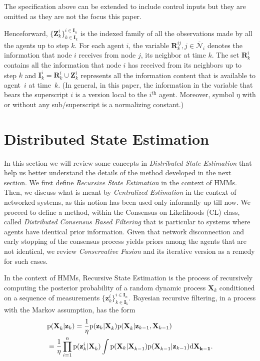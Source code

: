 \documentclass[journal]{IEEEtran}
\newcommand{\vect}[1]{{\mathbf{#1}}}
\theoremstyle{remark}
\newcommand{\pr}{\textrm{p}}
\newcommand{\XX}[3][2]{\mathbf{X}_{  #2}^{ #3}}
\newcommand{\bIn}{\boldsymbol{I}_{{n}}}
\newcommand{\bIk}{\boldsymbol{I}_{{k}}}
\newcommand{\zz}[3][2]{\mathbf{z}_{ #2}^{ #3}}
\newcommand{\ZZ}[3][2]{\mathbf{Z}_{ #2}^{ #3}}
\theoremstyle{definition}
\begin{document}
The specification above can be extended to
include control inputs but they are omitted as they are not the focus this
paper. 

Henceforward, $\{\ZZ{k}{i}\}^{i\in\bIn}_{k\in\bIk}$ is the indexed family of
all the observations made by all the agents up to step $k$. For each
agent $i$, the variable $\vect{R}_{k}^{ij}, j \in \overline{\mathcal{N}}_i $
denotes the information that node $i$ receives from node $j$, its neighbor at
time $k$. The set $\vect{R}_{k}^i$ contains all the information that node $i$
has received from its neighbors up to step $k$ and $\vect{I}_{k}^i =
\vect{R}_{k}^i \cup \vect{Z}_{k}^i$ represents all the information content that
is available to agent~$i$ at time~$k$. (In general, in this paper, the
information in the variable that bears the superscript $i$ is a version local
to the $i^\text{th}$ agent. Moreover, symbol $\eta$ with or without any
sub/superscript is a normalizing constant.)

\section{Distributed State Estimation} \label{subsec:Preliminaries}

In this section we will review some concepts in \textit{Distributed State
 Estimation} that help us better understand the details of the method developed
in the next section. We first define \textit{Recursive State Estimation} in the
context of HMMs. Then, we discuss what is meant by \textit{Centralized
 Estimation} in the context of networked systems, as this notion has 
been used only informally up till now.
We proceed to define a method,
within the Consensus on Likelihoods (CL) class, called \textit{Distributed
 Consensus Based Filtering} that is particular to systems where agents have
identical prior information. Given that network disconnection and early
stopping of the consensus process yields priors among the
agents that are not identical, we review \textit{Conservative Fusion} and its iterative version as a
remedy for such cases. 

In the context of HMMs, Recursive State Estimation is the process of
recursively computing the posterior probability of a random dynamic process
$\XX[]{k}{}$ conditioned on a sequence of measurements
$\{\zz{k}{i}\}^{i\in\bIn}_{k\in\bIk}$. Bayesian recursive filtering, in a
process with the Markov assumption, has the form
\begin{align}
\label{eq:geb}
&\pr(\XX[]{k}{}|\vect{z}_{k})  = \frac{1}{\eta}\pr(\vect{z}_{k}| \XX[]{k}{})\pr(\XX[]{k}{}|\vect{z}_{k-1},\vect{X}_{k-1}) \\
&= \frac{1}{\eta}\prod_{i=1}^{n} \pr(\vect{z}_{k}^i | \XX[]{k}{}) \int \pr(\vect{X}_{k} | \XX[]{k-1}{}) \pr(\XX[]{k-1}{}|\vect{z}_{k-1}) \text{d}\vect{\XX[]{k-1}}.\nonumber 
\end{align}
\end{document}
